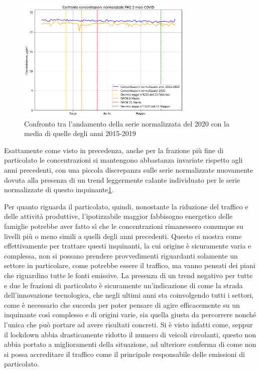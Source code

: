 \documentclass[a4paper]{report}
\begin{document}
\begin{figure}[h]
\centering
\includegraphics[width=0.75\textwidth]{pm25_covid_norm}
\caption{Confronto tra l'andamento della serie normalizzata del 2020 con la media di quelle degli anni 2015-2019}
\label{fig:pm25_covid_norm}
\end{figure}

Esattamente come visto in precedenza, anche per la frazione più fine di particolato le concentrazioni si mantengono abbastanza invariate rispetto agli anni precedenti, con una piccola discrepanza sulle serie normalizzate nuovamente dovuta alla presenza di un trend leggermente calante individuato per le serie normalizzate di questo inquinante\ref{fig:pm25_covid_norm}.

Per quanto riguarda il particolato, quindi, nonostante la riduzione del traffico e delle attività produttive, l'ipotizzabile maggior fabbisogno energetico
 delle famiglie potrebbe aver fatto sì che le concentrazioni rimanessero comunque su livelli più o meno simili a quelli degli anni precedenti.
Questo ci mostra come effettivamente per trattare questi inquinanti, la cui origine è sicuramente varia e complessa, non si possano prendere provvedimenti riguardanti solamente un settore in particolare, come potrebbe essere il traffico, ma vanno pensati dei piani che riguardino tutte le fonti emissive.
La presenza di un trend negativo per tutte e due le frazioni di particolato è sicuramente un'indicazione di come la strada dell'innovazione tecnologica, che negli ultimi anni sta coinvolgendo tutti i settori, come è necessario che succeda per poter pensare di agire efficacemente su un inquinante così complesso e di origini varie, sia quella giusta da percorrere nonché l'unica che può portare ad avere risultati concreti. Si è visto infatti come, seppur il lockdown abbia drasticamente ridotto il numero di veicoli circolanti, questo non abbia portato a miglioramenti della situazione, ad ulteriore conferma di come non si possa accreditare il traffico come il principale responsabile delle emissioni di particolato.
\end{document}
